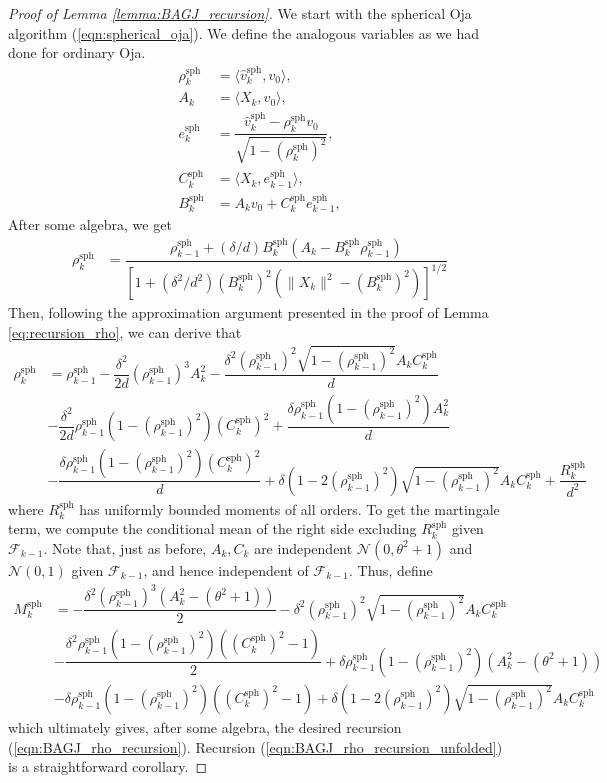 \documentclass[12pt]{article}
\newcommand{\sph}{\text{sph}}
\def\gF{{\mathcal{F}}}
\def\gN{{\mathcal{N}}}
\begin{document}
\begin{proof}[Proof of Lemma \ref{lemma:BAGJ_recursion}]
    We start with the spherical Oja algorithm (\ref{eqn:spherical_oja}). We define the analogous variables as we had done for ordinary Oja.
    \begin{align*}
        \rho^\sph_k &= \langle \hat v^\sph_k,v_0\rangle, \\
        A_k &= \langle X_k, v_0\rangle, \\
        e_k^\sph &= \dfrac{\hat v_k^\sph - \rho_k^\sph v_0}{\sqrt{1-(\rho_k^\sph)^2}},\\
        C_k^\sph &= \langle X_k, e_{k-1}^\sph\rangle,\\
        B_k^\sph &= A_kv_0 + C_k^\sph e_{k-1}^\sph,
    \end{align*}
    After some algebra, we get
    \begin{align*}
        \rho^\sph_k &= \dfrac{\rho^\sph_{k-1}+(\delta/d)B_k^\sph(A_k-B_k^\sph\rho^\sph_{k-1})}{[1+(\delta^2/d^2)(B_k^\sph)^2(\|X_k\|^2-(B_k^\sph)^2)]^{1/2}}
    \end{align*}
    Then, following the approximation argument presented in the proof of Lemma \ref{eq:recursion_rho}, we can derive that
    \begin{align*}
        \rho_k^\sph &= \rho_{k-1}^\sph - \dfrac{\delta^2}{2d}(\rho^\sph_{k-1})^3A^2_k - \dfrac{\delta^2(\rho^\sph_{k-1})^2\sqrt{1-(\rho_{k-1}^\sph)^2}A_kC_k^\sph}{d}\\
        &- \dfrac{\delta^2}{2d}\rho_{k-1}^\sph(1-(\rho^\sph_{k-1})^2)(C^\sph_k)^2+\dfrac{\delta\rho_{k-1}^\sph (1-(\rho^\sph_{k-1})^2)A_k^2}{d} \\
        &- \dfrac{\delta\rho_{k-1}^\sph(1-(\rho_{k-1}^\sph)^2)(C_k^\sph)^2}{d} + \delta(1-2(\rho^\sph_{k-1})^2)\sqrt{1-(\rho^\sph_{k-1})^2}A_kC_k^\sph +\dfrac{R_k^\sph}{d^2}
    \end{align*}where $R_k^\sph$ has uniformly bounded moments of all orders. To get the martingale term, we compute the conditional mean of the right side excluding $R_k^\sph$ given $\gF_{k-1}$. Note that, just as before, $A_k,C_k$ are independent $\gN(0,\theta^2+1)$ and $\gN(0,1)$ given $\gF_{k-1}$, and hence independent of $\gF_{k-1}$. Thus, define
    \begin{align*}
        M_k^\sph &= -\dfrac{\delta^2(\rho_{k-1}^\sph)^3(A_k^2-(\theta^2+1))}{2} - \delta^2(\rho^\sph_{k-1})^2\sqrt{1-(\rho^\sph_{k-1})^2}A_kC_k^\sph\\
        &-\dfrac{\delta^2\rho_{k-1}^\sph(1-(\rho^\sph_{k-1})^2)((C^\sph_k)^2-1)}{2}+\delta\rho^\sph_{k-1}(1-(\rho^\sph_{k-1})^2)(A_k^2-(\theta^2+1)) \\
        &- \delta\rho_{k-1}^\sph(1-(\rho^\sph_{k-1})^2)((C^\sph_k)^2-1)+ \delta(1-2(\rho^\sph_{k-1})^2)\sqrt{1-(\rho^\sph_{k-1})^2}A_kC_k^\sph
    \end{align*}which ultimately gives, after some algebra, the desired recursion (\ref{eqn:BAGJ_rho_recursion}). Recursion (\ref{eqn:BAGJ_rho_recursion_unfolded}) is a straightforward corollary.
\end{proof}
\end{document}
